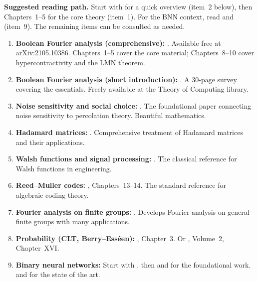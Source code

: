 \textbf{Suggested reading path.}
Start with \citet{dewolf2008brief} for a quick overview (item~2 below),
then \citet{odonnell2014analysis} Chapters~1--5 for the core theory
(item~1). For the BNN context, read \citet{courbariaux2015binaryconnect}
and \citet{wang2023bitnet} (item~9). The remaining items can be consulted
as needed.

\begin{enumerate}
  \item \textbf{Boolean Fourier analysis (comprehensive):}
    \citet{odonnell2014analysis}. Available free at arXiv:2105.10386.
    Chapters~1--5 cover the core material; Chapters~8--10 cover
    hypercontractivity and the LMN theorem.

  \item \textbf{Boolean Fourier analysis (short introduction):}
    \citet{dewolf2008brief}. A 30-page survey covering the essentials.
    Freely available at the Theory of Computing library.

  \item \textbf{Noise sensitivity and social choice:}
    \citet{benjamini1999noise}. The foundational paper connecting noise
    sensitivity to percolation theory. Beautiful mathematics.

  \item \textbf{Hadamard matrices:}
    \citet{horadam2007hadamard}. Comprehensive treatment of Hadamard
    matrices and their applications.

  \item \textbf{Walsh functions and signal processing:}
    \citet{beauchamp1984walsh}. The classical reference for Walsh
    functions in engineering.

  \item \textbf{Reed--Muller codes:}
    \citet{macwilliams1977theory}, Chapters~13--14. The standard
    reference for algebraic coding theory.

  \item \textbf{Fourier analysis on finite groups:}
    \citet{terras1999fourier}. Develops Fourier analysis on general
    finite groups with many applications.

  \item \textbf{Probability (CLT, Berry--Ess\'een):}
    \citet{durrett2019probability}, Chapter~3. Or
    \citet{feller1971introduction}, Volume~2, Chapter~XVI.

  \item \textbf{Binary neural networks:}
    Start with \citet{courbariaux2015binaryconnect}, then
    \citet{rastegari2016xnor} and \citet{hubara2016binarized} for the
    foundational work. \citet{wang2023bitnet} and \citet{ma2024era} for
    the state of the art.
\end{enumerate}
